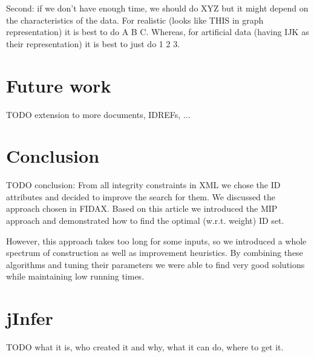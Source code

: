\documentclass[a4paper,12pt,oneside]{report}
\let\openright=\clearpage
\def\chapwithtoc#1{
\chapter*{#1}
\addcontentsline{toc}{chapter}{#1}
}
\begin{document}
Second: if we don't have enough time, we should do XYZ but it might depend on the characteristics of the data.
For realistic (looks like THIS in graph representation) it is best to do A B C.
Whereas, for artificial data (having IJK as their representation) it is best to just do 1 2 3.

\chapter{Future work}

TODO extension to more documents, IDREFs, ...  

\chapwithtoc{Conclusion}

TODO conclusion: From all integrity constraints in XML we chose the ID attributes and decided to improve the search for them. We discussed the approach chosen in FIDAX. Based on this article we introduced the MIP approach and demonstrated how to find the optimal (w.r.t. weight) ID set.

However, this approach takes too long for some inputs, so we introduced a whole spectrum of construction as well as improvement heuristics. By combining these algorithms and tuning their parameters we were able to find very good solutions while maintaining low running times.

\newpage
\nocite{*}



\listoftables
{}


\printnomenclature[2cm]


\appendix

\openright
{}

\chapter{jInfer}
\label{jInfer}

TODO what it is, who created it and why, what it can do, where to get it.
\end{document}
